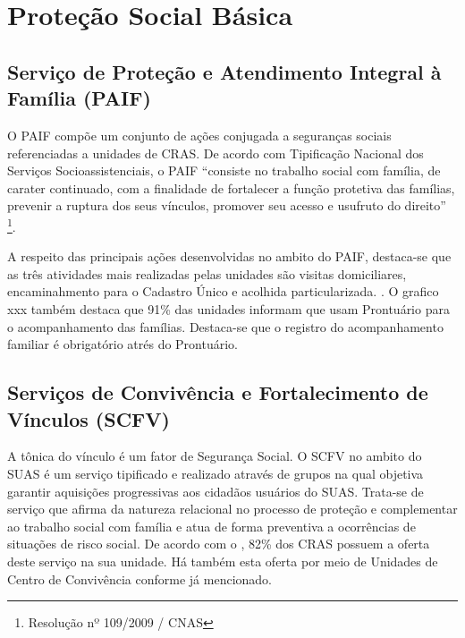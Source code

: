 \documentclass[
  brazilian]{report}
\begin{document}
\hypertarget{proteuxe7uxe3o-social-buxe1sica}{%
\section{Proteção Social Básica}\label{proteuxe7uxe3o-social-buxe1sica}}

\hypertarget{serviuxe7o-de-proteuxe7uxe3o-e-atendimento-integral-uxe0-famuxedlia-paif}{%
\subsection{Serviço de Proteção e Atendimento Integral à Família
(PAIF)}\label{serviuxe7o-de-proteuxe7uxe3o-e-atendimento-integral-uxe0-famuxedlia-paif}}

O PAIF compõe um conjunto de ações conjugada a seguranças sociais
referenciadas a unidades de CRAS. De acordo com Tipificação Nacional dos
Serviços Socioassistenciais, o PAIF ``consiste no trabalho social com
família, de carater continuado, com a finalidade de fortalecer a função
protetiva das famílias, prevenir a ruptura dos seus vínculos, promover
seu acesso e usufruto do direito''
\footnote{Resolução nº 109/2009 / CNAS}.

A respeito das principais ações desenvolvidas no ambito do PAIF,
destaca-se que as três atividades mais realizadas pelas unidades são
visitas domiciliares, encaminahmento para o Cadastro Único e acolhida
particularizada. . O grafico xxx também destaca que 91\% das unidades
informam que usam Prontuário para o acompanhamento das famílias.
Destaca-se que o registro do acompanhamento familiar é obrigatório atrés
do Prontuário.

\hypertarget{serviuxe7os-de-convivuxeancia-e-fortalecimento-de-vuxednculos-scfv}{%
\subsection{Serviços de Convivência e Fortalecimento de Vínculos
(SCFV)}\label{serviuxe7os-de-convivuxeancia-e-fortalecimento-de-vuxednculos-scfv}}

A tônica do vínculo é um fator de Segurança Social. O SCFV no ambito do
SUAS é um serviço tipificado e realizado através de grupos na qual
objetiva garantir aquisições progressivas aos cidadãos usuários do SUAS.
Trata-se de serviço que afirma da natureza relacional no processo de
proteção e complementar ao trabalho social com família e atua de forma
preventiva a ocorrências de situações de risco social. De acordo com o
, 82\% dos CRAS possuem a oferta deste serviço na
sua unidade. Há também esta oferta por meio de Unidades de Centro de
Convivência conforme já mencionado.
\end{document}
